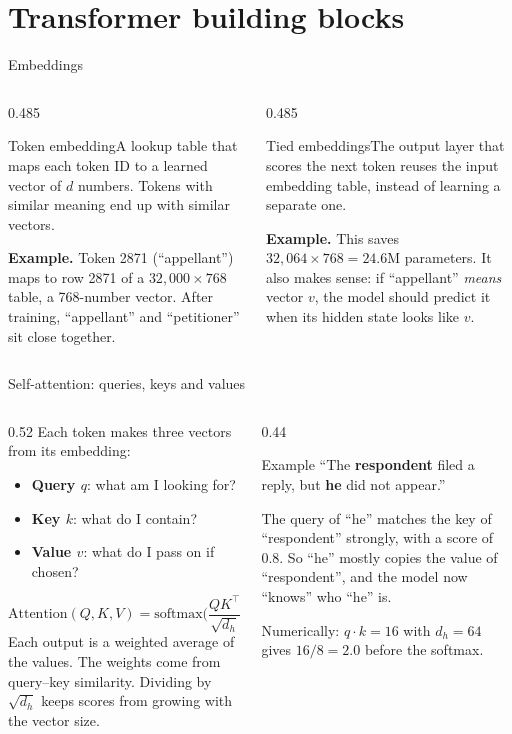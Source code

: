 \documentclass[aspectratio=169,11pt]{beamer}
\newcommand{\term}[3]{%
  \begin{block}{#1}\small #2\par\vspace{1mm}%
  {\color{exgreen}\textbf{Example.}} #3\end{block}}
\newcommand{\twoterms}[6]{%
  \begin{columns}[T]
    \begin{column}{0.485\textwidth}\term{#1}{#2}{#3}\end{column}
    \begin{column}{0.485\textwidth}\term{#4}{#5}{#6}\end{column}
  \end{columns}}
\begin{document}
\section{Transformer building blocks}

\begin{frame}{Embeddings}
  \twoterms{Token embedding}
  {A lookup table that maps each token ID to a learned vector of $d$ numbers. Tokens with similar meaning end up with similar vectors.}
  {Token 2871 (``appellant'') maps to row 2871 of a $32{,}000\times768$ table, a 768-number vector. After training, ``appellant'' and ``petitioner'' sit close together.}
  {Tied embeddings}
  {The output layer that scores the next token reuses the input embedding table, instead of learning a separate one.}
  {This saves $32{,}064\times768 = 24.6$M parameters. It also makes sense: if ``appellant'' \emph{means} vector $v$, the model should predict it when its hidden state looks like $v$.}
\end{frame}

\begin{frame}{Self-attention: queries, keys and values}
  \begin{columns}[T]
    \begin{column}{0.52\textwidth}
      \small
      Each token makes three vectors from its embedding:
      \begin{itemize}
        \item \textbf{Query $q$}: what am I looking for?
        \item \textbf{Key $k$}: what do I contain?
        \item \textbf{Value $v$}: what do I pass on if chosen?
      \end{itemize}
      \[
        \text{Attention}(Q,K,V)=\text{softmax}\!\Big(\frac{QK^\top}{\sqrt{d_h}}\Big)V
      \]
      Each output is a weighted average of the values. The weights come from query--key similarity.
      Dividing by $\sqrt{d_h}$ keeps scores from growing with the vector size.
    \end{column}
    \begin{column}{0.44\textwidth}
      \begin{exampleblock}{Example}
        \small
        ``The \textbf{respondent} filed a reply, but \textbf{he} did not appear.''
        \vspace{1mm}

        The query of ``he'' matches the key of ``respondent'' strongly, with a score of 0.8.
        So ``he'' mostly copies the value of ``respondent'', and the model now ``knows'' who ``he'' is.
        \vspace{1mm}

        Numerically: $q\cdot k = 16$ with $d_h=64$ gives $16/8=2.0$ before the softmax.
      \end{exampleblock}
    \end{column}
  \end{columns}
\end{frame}
\end{document}
